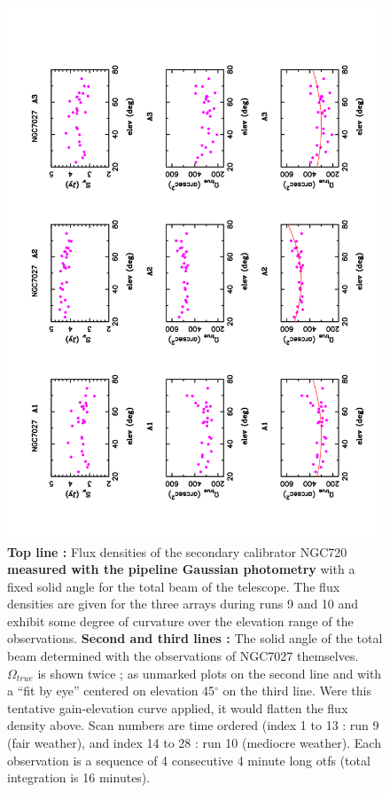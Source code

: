 \begin{figure}[p]
\begin{center}
  \includegraphics[clip, angle=-90, scale=0.6]{Figures/Flux_gain_curve_NGC7027}
  \caption[Gain elevation curve]{{\bf Top line :} Flux densities of the secondary calibrator NGC720 {\bf measured with the pipeline Gaussian photometry}
    with a fixed solid angle
    for the total beam of the telescope. The flux densities are given for the three arrays during runs 9 and 10  and  
    exhibit some degree of curvature over the elevation range of the observations.
    {\bf Second and third lines :} The solid angle of the total beam determined with the observations of NGC7027 themselves. $\Omega_{true}$
    is shown twice ; 
    as  unmarked plots on the second line and with  a ``fit by eye''  centered on  elevation 45$^{\circ}$ on the third line.
    Were this tentative gain-elevation curve applied, it  would flatten the flux density above.  
    Scan numbers are time ordered (index 1 to 13 : run 9 (fair weather), and index 14 to 28 : run 10 (mediocre weather).
    Each observation is a sequence of 4 consecutive 4 minute long otfs (total integration is 16 minutes).
}

\label{fig:gain_curve_NG7027}
\end{center}
\end{figure}


















